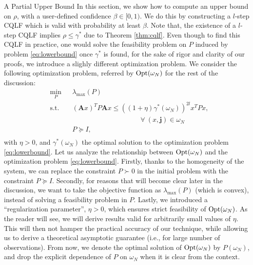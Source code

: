 \begin{subsection}{A Partial Upper Bound}\label{sec:IntroMainThm}
In this section, we show how to compute an upper bound on $\rho$, with a user-defined confidence $\beta \in [0, 1)$. We do this by constructing a $l$-step CQLF which is valid with probability at least $\beta$. Note that, the existence of a $l$-step CQLF implies 
$\rho \leq \gamma^*$ due to Theorem \ref{thm:cqlf}. Even though to find this CQLF in practice, one would solve the feasibility problem on $P$ induced by problem \eqref{eq:lowerbound} once $\gamma^*$ is found, for the sake of rigor and clarity of our proofs, we introduce a slighly different optimization problem. We consider the following optimization problem, referred by $\text{Opt}(\omega_N)$ for the rest of the discussion:
\begin{equation}\label{eqn:campiOpt03}
\begin{aligned}
& \min_{P} & & \lambda_{\max}(P) \\
& \text{s.t.} 
&  & (\mathbf{A}x)^T P \mathbf{A} x \leq { \left( (1 +\eta)\gamma^*(\omega_N) \right)}^{2l} x^T P x,\\
& && \qquad \qquad \qquad \qquad \qquad \forall\ (x, \mathbf{j}) \in \omega_N \\
& && P \succeq I, \\
\end{aligned}
\end{equation}
with $\eta > 0$, and $\gamma^*(\omega_N)$ the optimal solution to the optimization problem \eqref{eq:lowerbound}. Let us analyze the relationship between $\text{Opt}(\omega_N)$ and the optimization problem \eqref{eq:lowerbound}. Firstly, thanks to the homogeneity of the system, we can replace the constraint $P \succ 0$ in the initial problem with the constraint $P \succeq I$. Secondly, for reasons that will become clear later in the discussion, we want to take the objective function as $\lambda_{\max}(P)$ (which is convex), instead of solving a feasibility problem in $P$. Lastly, we introduced a ``regularization parameter'', $\eta > 0$, which ensures strict feasibility of $\text{Opt}(\omega_N)$. As the reader will see, we will derive results valid for arbitrarily small values of $\eta$. This will then not hamper the practical accuracy of our technique, while allowing us to derive a theoretical asymptotic guarantee (i.e., for large number of observations). From now, we denote the optimal solution of $\text{Opt}(\omega_N)$ by $P(\omega_N)$, and drop the explicit dependence of $P$ on $\omega_N$ when it is clear from the context.


\end{subsection}
